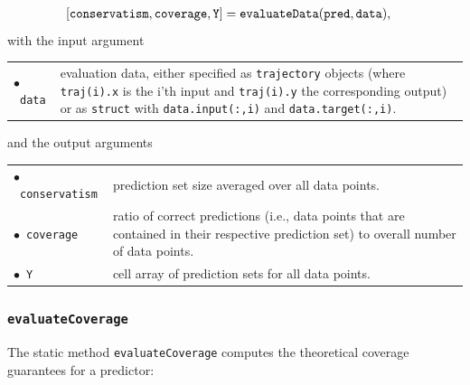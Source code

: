 \begin{equation*}
	\begin{split}
		&[\texttt{conservatism}, \texttt{coverage}, \texttt{Y}] = {\normalfont \texttt{evaluateData}}(\texttt{pred},\texttt{data}),
	\end{split}
\end{equation*}
with the input argument
\begin{center}
	\renewcommand{\arraystretch}{1.3}
	\begin{tabular}[t]{l p{13cm} }
		$\bullet$~\texttt{data} & evaluation data, either specified as \texttt{trajectory} objects (where \texttt{traj(i).x} is the i'th input and \texttt{traj(i).y} the corresponding output) or as \texttt{struct} with \texttt{data.input(:,i)} and \texttt{data.target(:,i)}.\\
	\end{tabular}
\end{center}
and the output arguments
\begin{center}
	\renewcommand{\arraystretch}{1.3}
	\begin{tabular}[t]{l p{13cm} }
		$\bullet$~\texttt{conservatism} & prediction set size averaged over all data points.\\
		$\bullet$~\texttt{coverage} & ratio of correct predictions (i.e., data points that are contained in their respective prediction set) to overall number of data points.\\
		$\bullet$~\texttt{Y} & cell array of prediction sets for all data points.\\
	\end{tabular}
\end{center}

\subsubsection{\texttt{evaluateCoverage}}

The static method \texttt{evaluateCoverage} computes the theoretical coverage guarantees for a predictor:

